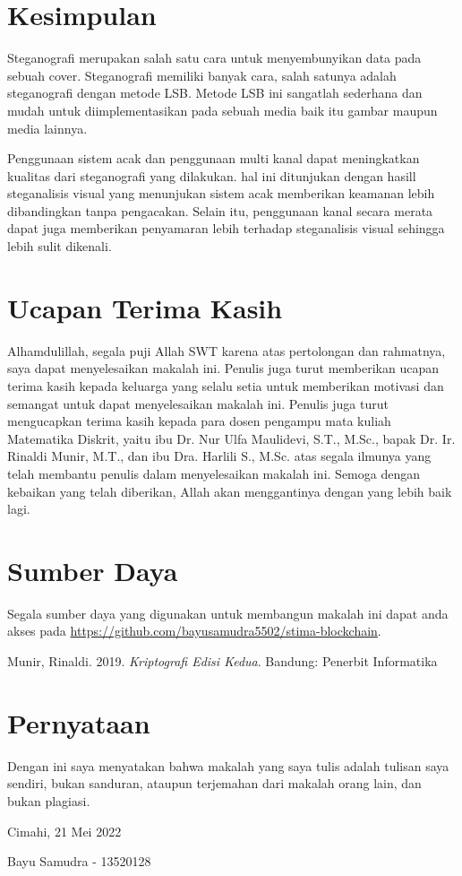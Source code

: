 \documentclass[10pt,conference]{IEEEtran}
\theoremstyle{definition}
\begin{document}
\section{Kesimpulan}
Steganografi merupakan salah satu cara untuk menyembunyikan data pada sebuah cover. Steganografi memiliki banyak cara, salah satunya adalah steganografi dengan metode LSB. Metode LSB ini sangatlah sederhana dan mudah
untuk diimplementasikan pada sebuah media baik itu gambar maupun media lainnya. 

Penggunaan sistem acak dan penggunaan multi kanal dapat meningkatkan kualitas dari steganografi yang dilakukan. hal ini ditunjukan dengan hasill steganalisis visual yang menunjukan sistem acak memberikan keamanan lebih
dibandingkan tanpa pengacakan. Selain itu, penggunaan kanal secara merata dapat juga memberikan penyamaran lebih terhadap steganalisis visual sehingga lebih sulit dikenali.

\section*{Ucapan Terima Kasih}
Alhamdulillah, segala puji Allah SWT karena atas pertolongan dan rahmatnya, saya dapat menyelesaikan makalah ini. Penulis juga turut memberikan ucapan terima kasih kepada keluarga yang selalu setia untuk
memberikan motivasi dan semangat untuk dapat menyelesaikan makalah ini. Penulis juga turut mengucapkan terima kasih kepada para dosen pengampu mata kuliah Matematika Diskrit, yaitu ibu Dr. Nur Ulfa Maulidevi, S.T., M.Sc., bapak Dr. Ir.
Rinaldi Munir, M.T., dan ibu Dra. Harlili S., M.Sc. atas segala ilmunya yang telah membantu penulis dalam menyelesaikan makalah ini. Semoga dengan kebaikan yang telah diberikan, Allah akan menggantinya dengan yang lebih baik lagi.

\section*{Sumber Daya}
Segala sumber daya yang digunakan untuk membangun makalah ini dapat anda akses pada \url{https://github.com/bayusamudra5502/stima-blockchain}.


\begin{thebibliography}{00}
 Munir, Rinaldi. 2019. \emph{Kriptografi Edisi Kedua}. Bandung: Penerbit Informatika 
\end{thebibliography}

\section*{Pernyataan}
Dengan ini saya menyatakan bahwa makalah yang saya tulis adalah tulisan saya sendiri, bukan sanduran, ataupun terjemahan dari makalah orang lain, dan bukan plagiasi.


\vspace{20px}
\hspace*{\fill} Cimahi, 21 Mei 2022

\vspace{50px}
\hspace*{\fill} Bayu Samudra - 13520128
\end{document}
